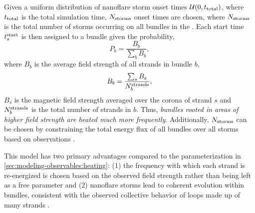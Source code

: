 Given a uniform distribution of nanoflare storm onset times $\mathcal{U}(0,t_\textup{total})$, where $t_\textup{total}$ is the total simulation time, $N_\textup{storms}$ onset times are chosen, where $N_\textup{storms}$ is the total number of storms occurring on all bundles in the \AR{}. Each start time $t_s^\textup{start}$ is then assigned to a bundle given the probability,
\begin{equation*}
    P_b = \frac{B_b}{\sum_b B_b},
\end{equation*}
where $B_b$ is the average field strength of all strands in bundle $b$,
\begin{equation*}
    B_b = \frac{\sum_s B_s}{N^\textup{strands}_b},
\end{equation*}
$B_s$ is the magnetic field strength averaged over the corona of strand $s$ and $N^\textup{strands}_b$ is the total number of strands in $b$. Thus, \textit{bundles rooted in areas of higher field strength are heated much more frequently}. Additionally, $N_\textup{storms}$ can be chosen by constraining the total energy flux of all bundles over all storms based on observations \citep[e.g. \SI{e7}{\erg\per\square\cm\per\second} from][as in \autoref{sec:modeling-observables:heating}]{withbroe_mass_1977}.

This model has two primary advantages compared to the parameterization in \autoref{sec:modeling-observables:heating}: (1) the frequency with which each strand is re-energized is chosen based on the observed field strength rather than being left as a free parameter and (2) nanoflare storms lead to coherent evolution within bundles, consistent with the observed collective behavior of loops made up of many strands \citep{klimchuk_key_2015}.

